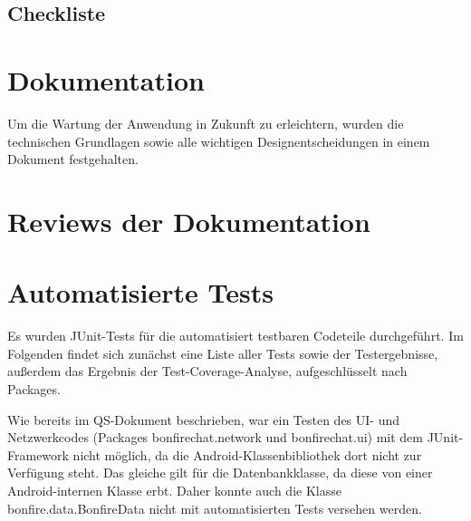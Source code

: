 \subsection{Checkliste}







\clearpage
\section{Dokumentation}

Um die Wartung der Anwendung in Zukunft zu erleichtern, wurden die technischen Grundlagen
sowie alle wichtigen Designentscheidungen in einem Dokument festgehalten.



\clearpage

\section{Reviews der Dokumentation}





\clearpage
\section{Automatisierte Tests}

Es wurden JUnit-Tests für die automatisiert testbaren Codeteile durchgeführt.
Im Folgenden findet sich zunächst eine Liste aller Tests sowie der Testergebnisse,
außerdem das Ergebnis der Test-Coverage-Analyse, aufgeschlüsselt nach Packages.

Wie bereits im QS-Dokument beschrieben, war ein Testen des UI- und Netzwerkcodes
(Packages bonfirechat.network und bonfirechat.ui)
mit dem JUnit-Framework nicht möglich, da die Android-Klassenbibliothek dort nicht
zur Verfügung steht. Das gleiche gilt für die Datenbankklasse, da diese von einer
Android-internen Klasse erbt. Daher konnte auch die Klasse bonfire.data.BonfireData
nicht mit automatisierten Tests versehen werden.

